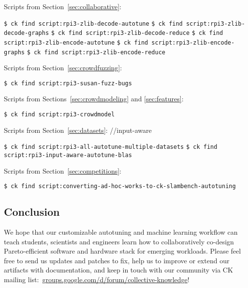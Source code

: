 Scripts from Section~\ref{sec:collaborative}:

\begin{flushleft}
\texttt{\$ ck find script:rpi3-zlib-decode-autotune} \newline
\texttt{\$ ck find script:rpi3-zlib-decode-graphs} \newline
\texttt{\$ ck find script:rpi3-zlib-decode-reduce} \newline
\texttt{\$ ck find script:rpi3-zlib-encode-autotune} \newline
\texttt{\$ ck find script:rpi3-zlib-encode-graphs} \newline
\texttt{\$ ck find script:rpi3-zlib-encode-reduce} \newline
\end{flushleft}

Scripts from Section~\ref{sec:crowdfuzzing}:

\begin{flushleft}
\texttt{\$ ck find script:rpi3-susan-fuzz-bugs} \newline
\end{flushleft}

Scripts from Sections~\ref{sec:crowdmodeling} and \ref{sec:features}:

\begin{flushleft}
\texttt{\$ ck find script:rpi3-crowdmodel} \newline
\end{flushleft}

Scripts from Section~\ref{sec:datasets}: //input-aware

\begin{flushleft}
\texttt{\$ ck find script:rpi3-all-autotune-multiple-datasets} \newline
\texttt{\$ ck find script:rpi3-input-aware-autotune-blas} \newline
\end{flushleft}

Scripts from Section~\ref{sec:competitions}:

\begin{flushleft}
\texttt{\$ ck find script:converting-ad-hoc-works-to-ck-slambench-autotuning} \newline
\end{flushleft}


\subsection{Conclusion}

We hope that our customizable autotuning and machine learning workflow 
can teach students, scientists and engineers learn how to collaboratively
co-design Pareto-efficient software and hardware stack for emerging workloads.
%
Please feel free to send us updates and patches to fix, help us to improve or extend
our artifacts with documentation, and keep in touch with our community via
CK mailing list:~\href{https://groups.google.com/d/forum/collective-knowledge}{groups.google.com/d/forum/collective-knowledge}!

